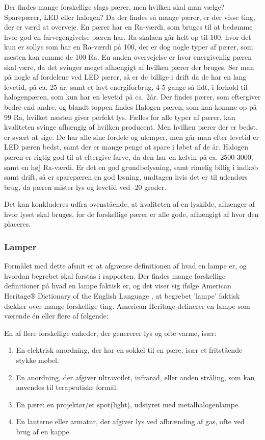 Der findes mange forskellige slags pærer, men hvilken skal man vælge? Sparepærer, LED eller halogen?
Da der findes så mange pærer, er der visse ting, der er værd at overveje. En pærer har en Ra-værdi, som bruges til at bedømme hvor god en farvegengivelse pæren har. Ra-skalaen går helt op til 100, hvor det kun er sollys som har en Ra-værdi på 100, der er dog nogle typer af pærer, som næsten kan ramme de 100 Ra.\cite{halogen_paere}
En anden overvejelse er hvor energivenlig pæren skal være, da det svinger meget afhængigt af hvilken pærer der bruges. Ser man på nogle af fordelene ved LED pærer, så er de billige i drift da de har en lang levetid, på ca. 25 år, samt et lavt energiforbrug\cite{LED}, 4-5 gange så lidt, i forhold til halogenpæren, som kun har en levetid på ca. 2år\cite{vaelg_paere}. 
Der findes pærer, som eftergiver bedre end andre, og blandt toppen findes Halogen pæren, som kan komme op på 99 Ra, hvilket næsten giver perfekt lys\cite{halogen_paere}. 
Fælles for alle typer af pærer, kan kvaliteten svinge afhængig af hvilken producent. Men hvilken pærer der er bedst, er svært at sige. De har alle sine fordele og ulemper, men går man efter levetid er LED pæren bedst, samt der er mange penge at spare i løbet af de år. Halogen pæren er rigtig god til at eftergive farve, da den har en kelvin på ca. 2500-3000, samt en høj Ra-værdi. Er det en god grundbelysning, samt rimelig billig i indkøb samt drift, så er sparepæren en god løsning, undtagen hvis det er til udendørs brug, da pæren mister lys og levetid ved -20 grader\cite{sparepaerer}.

Det kan konkluderes udfra ovenstående, at kvaliteten af en lyskilde, afhænger af hvor lyset skal bruges, for de forskellige pærer er alle gode, afhængigt af hvor den placeres. 


\subsubsection{Lamper}
Formålet med dette afsnit er at afgrænse definitionen af hvad en lampe er, og hvordan begrebet skal forstås i rapporten.
Der findes mange forskellige definitioner på hvad en lampe faktisk er, og det viser sig ifølge American Heritage® Dictionary of the English Language \cite{american_heritage}, at begrebet ’lampe’ faktisk dækker over mange forskellige ting. American Heritage definerer en lampe som værende én eller flere af følgende:

En af flere forskellige enheder, der genererer lys og ofte varme, især:
\begin{enumerate}
    \item En elektrisk anordning, der har en sokkel til en pære, især et fritstående stykke møbel.
    \item En anordning, der afgiver ultravoilet, infrarød, eller anden stråling, som kan anvendes til terapeutiske formål.
    \item En pære: en projektør/et spot(light), udstyret med metalhalogenlampe.
    \item En lanterne eller armatur, der afgiver lys ved afbrænding af gas, ofte ved brug af en kappe.
\end{enumerate}

